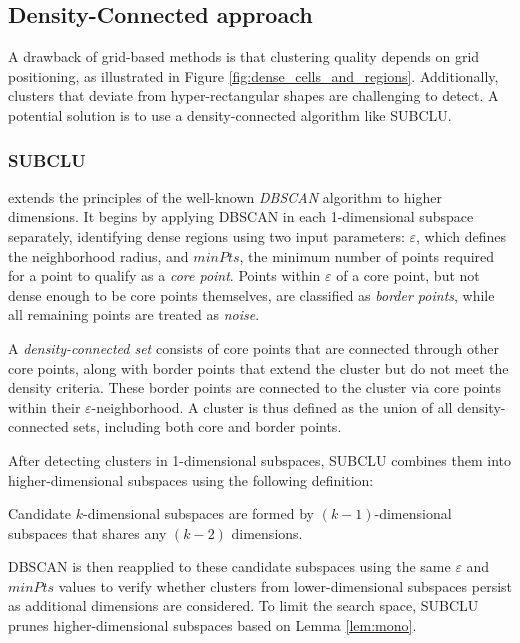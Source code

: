 \subsection{Density-Connected approach}
A drawback of grid-based methods is that clustering quality depends on grid positioning, as illustrated in Figure \ref{fig:dense_cells_and_regions}. Additionally, clusters that deviate from hyper-rectangular shapes are challenging to detect. A potential solution is to use a density-connected algorithm like SUBCLU.

\subsubsection{SUBCLU}
extends the principles of the well-known \textit{DBSCAN} algorithm \cite{dbscan} to higher dimensions. It begins by applying DBSCAN in each 1-dimensional subspace separately, identifying dense regions using two input parameters: $\varepsilon$, which defines the neighborhood radius, and $minPts$, the minimum number of points required for a point to qualify as a \textit{core point}. Points within $\varepsilon$ of a core point, but not dense enough to be core points themselves, are classified as \textit{border points}, while all remaining points are treated as \textit{noise}.

A \textit{density-connected set} consists of core points that are connected through other core points, along with border points that extend the cluster but do not meet the density criteria. These border points are connected to the cluster via core points within their $\varepsilon$-neighborhood. A cluster is thus defined as the union of all density-connected sets, including both core and border points.

After detecting clusters in 1-dimensional subspaces, SUBCLU combines them into higher-dimensional subspaces using the following definition:
\begin{definition}
    Candidate $k$-dimensional subspaces are formed by $(k-1)$-dimensional subspaces that shares any $(k-2)$ dimensions.
\end{definition}

DBSCAN is then reapplied to these candidate subspaces using the same $\varepsilon$ and $minPts$ values to verify whether clusters from lower-dimensional subspaces persist as additional dimensions are considered. To limit the search space, SUBCLU prunes higher-dimensional subspaces based on Lemma \ref{lem:mono}.


